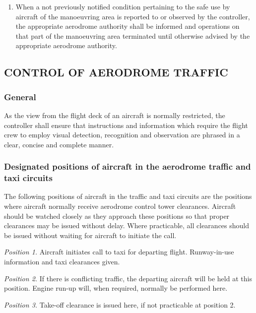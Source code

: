 \documentclass[../vATM.tex]{subfiles}
\begin{document}
\begin{enumerate}[label=\arabic{section}.\arabic{subsection}.\arabic*]

        \item When a not previously notified condition pertaining to the safe use by aircraft of the manoeuvring area is reported to or observed by the controller, the appropriate aerodrome authority shall be informed and operations on that part of the manoeuvring area terminated until otherwise advised by the appropriate aerodrome authority.
    \end{enumerate}

    \subsection[Control of aerodrome traffic]{CONTROL OF AERODROME TRAFFIC}

    \subsubsection{General}

    As the view from the flight deck of an aircraft is normally restricted, the controller shall ensure that instructions and information which require the flight crew to employ visual detection, recognition and observation are phrased in a clear, concise and complete manner.

    \subsubsection{Designated positions of aircraft in the aerodrome traffic and taxi circuits} \label{7.6.2}

    The following positions of aircraft in the traffic and taxi circuits are the positions where aircraft normally receive aerodrome control tower clearances. Aircraft should be watched closely as they approach these positions so that proper clearances may be issued without delay. Where practicable, all clearances should be issued without waiting for aircraft to initiate the call.

    \textit{Position 1.} Aircraft initiates call to taxi for departing flight. Runway-in-use information and taxi clearances given.

    \textit{Position 2.} If there is conflicting traffic, the departing aircraft will be held at this position. Engine run-up will, when required, normally be performed here.

    \textit{Position 3.} Take-off clearance is issued here, if not practicable at position 2.
\end{document}
